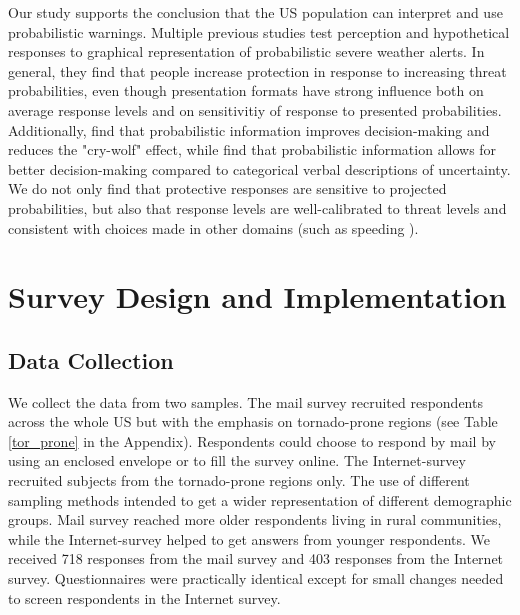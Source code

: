 \documentclass{ametsocV6.1}
\begin{document}
Our study supports the conclusion that the US population can interpret and use probabilistic warnings. Multiple previous studies \citep{ash_tornado_2014, lindell_perceptions_2016, miran_user_2017-1} test perception and hypothetical responses to graphical representation of probabilistic severe weather alerts. In general, they find that people increase protection in response to increasing threat probabilities, even though presentation formats have strong influence both on average response levels and on sensitivitiy of response to presented probabilities. Additionally, \cite{leclerc_cry_2015} find that probabilistic information improves decision-making and reduces the "cry-wolf" effect, while \citet{krocak_exploring_2022} find that probabilistic information allows for better decision-making compared to categorical verbal descriptions of uncertainty. We do not only find that protective responses are sensitive to projected probabilities, but also that response levels are well-calibrated to threat levels and consistent with choices made in other domains (such as speeding \citep{wolff_value_2014}).



\vspace{20pt}

\section{Survey Design and Implementation}

\vspace{10pt}
\subsection{Data Collection} 
We collect the data from two samples. The mail survey recruited respondents across the whole US but with the emphasis on tornado-prone regions (see Table \ref{tor_prone} in the Appendix). Respondents could choose to respond by mail by using an enclosed envelope or to fill the survey online. The Internet-survey recruited subjects from the tornado-prone regions only. The use of different sampling methods intended to get a wider representation of different demographic groups. Mail survey reached more older respondents living in rural communities, while the Internet-survey helped to get answers from younger respondents. We received 718 responses from the mail survey and 403 responses from the Internet survey. Questionnaires were practically identical  except for small changes needed to screen respondents in the Internet survey. 
\end{document}
